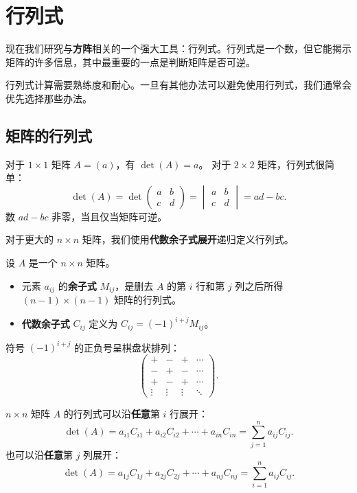 \section{行列式}

现在我们研究与\textbf{方阵}相关的一个强大工具：行列式。行列式是一个数，但它能揭示矩阵的许多信息，其中最重要的一点是判断矩阵是否可逆。

行列式计算需要熟练度和耐心。一旦有其他办法可以避免使用行列式，我们通常会优先选择那些办法。

\subsection{矩阵的行列式}

对于 $1\times1$ 矩阵 $A=(a)$，有 $\det(A)=a$。
对于 $2\times2$ 矩阵，行列式很简单：
\[ \det(A)=\det\begin{pmatrix}a&b\\c&d\end{pmatrix}=\begin{vmatrix}a&b\\c&d\end{vmatrix}=ad-bc. \]
数 $ad-bc$ 非零，当且仅当矩阵可逆。

对于更大的 $n\times n$ 矩阵，我们使用\textbf{代数余子式展开}递归定义行列式。

\begin{definition}
设 $A$ 是一个 $n\times n$ 矩阵。
\begin{itemize}
    \item 元素 $a_{ij}$ 的\textbf{余子式} $M_{ij}$，是删去 $A$ 的第 $i$ 行和第 $j$ 列之后所得 $(n-1)\times(n-1)$ 矩阵的行列式。
    \item \textbf{代数余子式} $C_{ij}$ 定义为 $C_{ij}=(-1)^{i+j}M_{ij}$。
\end{itemize}
\end{definition}

符号 $(-1)^{i+j}$ 的正负号呈棋盘状排列：
\[
\begin{pmatrix}
+&-&+&\cdots\\
-&+&-&\cdots\\
+&-&+&\cdots\\
\vdots&\vdots&\vdots&\ddots
\end{pmatrix}.
\]

\begin{theorem}[代数余子式展开]
$n\times n$ 矩阵 $A$ 的行列式可以沿\textbf{任意}第 $i$ 行展开：
\[ \det(A)=a_{i1}C_{i1}+a_{i2}C_{i2}+\cdots+a_{in}C_{in}=\sum_{j=1}^{n}a_{ij}C_{ij}. \]
也可以沿\textbf{任意}第 $j$ 列展开：
\[ \det(A)=a_{1j}C_{1j}+a_{2j}C_{2j}+\cdots+a_{nj}C_{nj}=\sum_{i=1}^{n}a_{ij}C_{ij}. \]
\end{theorem}

